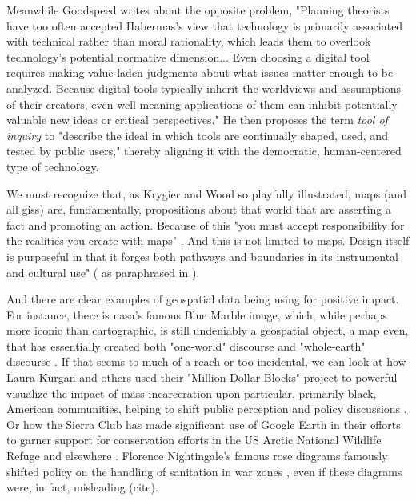 Meanwhile Goodspeed writes about the opposite problem, "Planning theorists have too often accepted Habermas's view that technology is primarily associated with technical rather than moral rationality, which leads them to overlook technology's potential normative dimension... Even choosing a digital tool requires making value-laden judgments about what issues matter enough to be analyzed. Because digital tools typically inherit the worldviews and assumptions of their creators, even well-meaning applications of them can inhibit potentially valuable new ideas or critical perspectives." He then proposes the term \textit{tool of inquiry} to "describe the ideal in which tools are continually shaped, used, and tested by public users," \cite{goodspeedScenarioPlanningCities2020} thereby aligning it with the democratic, human-centered type of technology.

We must recognize that, as Krygier and Wood so playfully illustrated, maps (and all \acp{gis}) are, fundamentally, propositions about that world that are asserting a fact and promoting an action. Because of this "you must accept responsibility for the realities you create with maps" \cite{krygierCeEstPas2011}. And this is not limited to maps. Design itself is purposeful in that it forges both pathways and boundaries in its instrumental and cultural use" (\cite{paceyCultureTechnology1983} as paraphrased in \cite{nobleAlgorithmsOppressionHow2018}). 

And there are clear examples of geospatial data being using for positive impact. For instance, there is \ac{nasa}'s famous Blue Marble image, which, while perhaps more iconic than cartographic, is still undeniably a geospatial object, a map even, that has essentially created both "one-world" discourse and "whole-earth" discourse \cite{propenCartographicRepresentationConstruction2011}. If that seems to much of a reach or too incidental, we can look at how Laura Kurgan and others used their "Million Dollar Blocks" project to powerful visualize the impact of mass incarceration upon particular, primarily black, American communities, helping to shift public perception and policy discussions \cite{kurganCloseDistanceMapping2013}. Or how the Sierra Club has made significant use of Google Earth in their efforts to garner support for conservation efforts in the US Arctic National Wildlife Refuge and elsewhere \cite{propenCartographicRepresentationConstruction2011}. Florence Nightingale's famous rose diagrams famously shifted policy on the handling of sanitation in war zones \cite{friendlyBriefHistoryData2008}, even if these diagrams were, in fact, misleading (cite).


